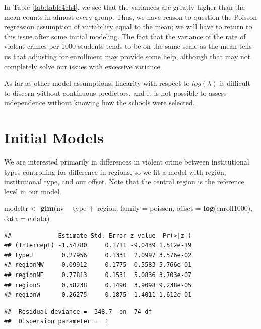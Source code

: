 \documentclass[
]{krantz}
\newenvironment{Shaded}{\begin{snugshade}}{\end{snugshade}}
\newcommand{\DataTypeTok}[1]{\textcolor[rgb]{0.27,0.27,0.27}{#1}}
\newcommand{\KeywordTok}[1]{\textcolor[rgb]{0.27,0.27,0.27}{\textbf{#1}}}
\newcommand{\NormalTok}[1]{#1}
\newcommand{\OperatorTok}[1]{\textcolor[rgb]{0.43,0.43,0.43}{\textbf{#1}}}
\newcommand{\StringTok}[1]{\textcolor[rgb]{0.5,0.5,0.5}{#1}}
\begin{document}
In Table \ref{tab:table4ch4}, we see that the variances are greatly higher than the mean counts in almost every group. Thus, we have reason to question the Poisson regression assumption of variability equal to the mean; we will have to return to this issue after some initial modeling. The fact that the variance of the rate of violent crimes per 1000 students tends to be on the same scale as the mean tells us that adjusting for enrollment may provide some help, although that may not completely solve our issues with excessive variance.

As far as other model assumptions, linearity with respect to \(log(\lambda)\) is difficult to discern without continuous predictors, and it is not possible to assess independence without knowing how the schools were selected.

\hypertarget{initial-models}{%
\section{Initial Models}\label{initial-models}}

We are interested primarily in differences in violent crime between institutional types controlling for difference in regions, so we fit a model with region, institutional type, and our offset. Note that the central region is the reference level in our model.

\begin{Shaded}
\begin{Highlighting}[]
\NormalTok{modeltr <-}\StringTok{ }\KeywordTok{glm}\NormalTok{(nv }\OperatorTok{~}\StringTok{ }\NormalTok{type }\OperatorTok{+}\StringTok{ }\NormalTok{region, }\DataTypeTok{family =}\NormalTok{ poisson,}
               \DataTypeTok{offset =} \KeywordTok{log}\NormalTok{(enroll1000), }\DataTypeTok{data =}\NormalTok{ c.data)}
\end{Highlighting}
\end{Shaded}

\begin{verbatim}
##             Estimate Std. Error z value  Pr(>|z|)
## (Intercept) -1.54780     0.1711 -9.0439 1.512e-19
## typeU        0.27956     0.1331  2.0997 3.576e-02
## regionMW     0.09912     0.1775  0.5583 5.766e-01
## regionNE     0.77813     0.1531  5.0836 3.703e-07
## regionS      0.58238     0.1490  3.9098 9.238e-05
## regionW      0.26275     0.1875  1.4011 1.612e-01
\end{verbatim}

\begin{verbatim}
##  Residual deviance =  348.7  on  74 df 
##  Dispersion parameter =  1
\end{verbatim}
\end{document}
